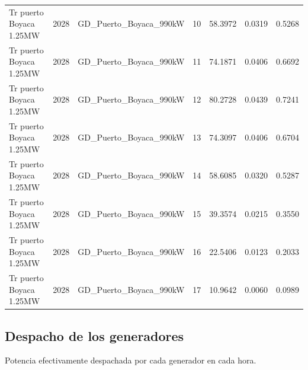 \documentclass[11pt,a4paper]{article}
\begin{document}
\begin{longtable}{llllrrr}
Tr puerto Boyaca 1.25MW & 2028 & GD\_Puerto\_Boyaca\_990kW & 10 & 58.3972 & 0.0319 & 0.5268 \\
Tr puerto Boyaca 1.25MW & 2028 & GD\_Puerto\_Boyaca\_990kW & 11 & 74.1871 & 0.0406 & 0.6692 \\
Tr puerto Boyaca 1.25MW & 2028 & GD\_Puerto\_Boyaca\_990kW & 12 & 80.2728 & 0.0439 & 0.7241 \\
Tr puerto Boyaca 1.25MW & 2028 & GD\_Puerto\_Boyaca\_990kW & 13 & 74.3097 & 0.0406 & 0.6704 \\
Tr puerto Boyaca 1.25MW & 2028 & GD\_Puerto\_Boyaca\_990kW & 14 & 58.6085 & 0.0320 & 0.5287 \\
Tr puerto Boyaca 1.25MW & 2028 & GD\_Puerto\_Boyaca\_990kW & 15 & 39.3574 & 0.0215 & 0.3550 \\
Tr puerto Boyaca 1.25MW & 2028 & GD\_Puerto\_Boyaca\_990kW & 16 & 22.5406 & 0.0123 & 0.2033 \\
Tr puerto Boyaca 1.25MW & 2028 & GD\_Puerto\_Boyaca\_990kW & 17 & 10.9642 & 0.0060 & 0.0989 \\
\end{longtable}

\subsection{Despacho de los generadores}

Potencia efectivamente despachada por cada generador en cada hora.
\end{document}
